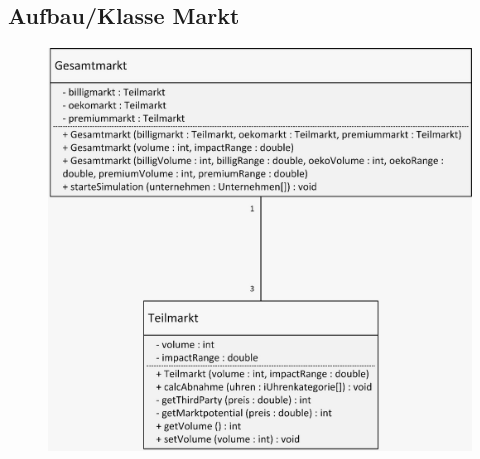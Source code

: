 \subsection{Aufbau/Klasse Markt}
\begin{figure} [!h]
	\centering
	\includegraphics[scale=0.3]{img/Markt.png} 
\end{figure}
\clearpage
